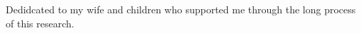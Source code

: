 \mbox{}\\\mbox{}\\\mbox{}\\\mbox{}\\\mbox{}\\ %
\begin{center}
Dedidcated to my wife and children who supported me through the long process of this research. 
\end{center}
